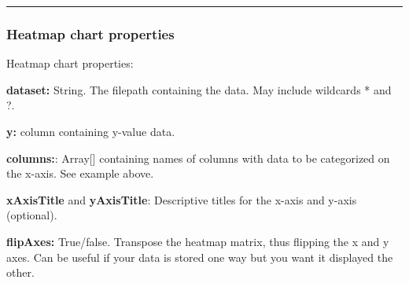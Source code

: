 \begin{Shaded}
\begin{Highlighting}[]
\KeywordTok{:}
\AttributeTok{  }\KeywordTok{:}
\AttributeTok{    }\KeywordTok{{-}}\AttributeTok{ }\KeywordTok{:}\AttributeTok{ }
\AttributeTok{      }\KeywordTok{:}
\AttributeTok{      }\KeywordTok{:}\AttributeTok{ }
\AttributeTok{      }\KeywordTok{:}
\AttributeTok{      }\KeywordTok{:}\AttributeTok{ }\KeywordTok{[}\KeywordTok{,}\KeywordTok{,}\KeywordTok{,}\KeywordTok{,}\KeywordTok{,}\KeywordTok{,}\KeywordTok{,}
\AttributeTok{                }\KeywordTok{,}\KeywordTok{,}\KeywordTok{]}
\AttributeTok{      }\KeywordTok{:}\AttributeTok{ }
\AttributeTok{      }\KeywordTok{:}\AttributeTok{ }
\AttributeTok{      }\KeywordTok{:}\AttributeTok{ }
\end{Highlighting}
\end{Shaded}

\begin{center}\rule{0.5\linewidth}{0.5pt}\end{center}

\hypertarget{heatmap-chart-properties}{%
\subsubsection{Heatmap chart
properties}\label{heatmap-chart-properties}}

Heatmap chart properties:

\textbf{dataset:} String. The filepath containing the data. May include
wildcards * and ?.

\textbf{y:} column containing y-value data.

\textbf{columns:}: Array{[}{]} containing names of columns with data to
be categorized on the x-axis. See example above.

\textbf{xAxisTitle} and \textbf{yAxisTitle}: Descriptive titles for the
x-axis and y-axis (optional).

\textbf{flipAxes:} True/false. Transpose the heatmap matrix, thus
flipping the x and y axes. Can be useful if your data is stored one way
but you want it displayed the other.
